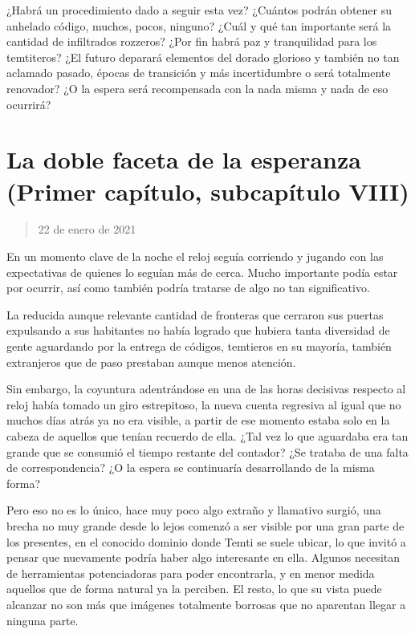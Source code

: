 \documentclass[
  spanish,
]{book}
\begin{document}
¿Habrá un procedimiento dado a seguir esta vez? ¿Cuántos podrán obtener su anhelado código, muchos, pocos, ninguno? ¿Cuál y qué tan importante será la cantidad de infiltrados rozzeros? ¿Por fin habrá paz y tranquilidad para los temtiteros? ¿El futuro deparará elementos del dorado glorioso y también no tan aclamado pasado, épocas de transición y más incertidumbre o será totalmente renovador? ¿O la espera será recompensada con la nada misma y nada de eso ocurrirá?

\hypertarget{la-doble-faceta-de-la-esperanza-primer-capuxedtulo-subcapuxedtulo-viii}{%
\section{La doble faceta de la esperanza (Primer capítulo, subcapítulo VIII)}\label{la-doble-faceta-de-la-esperanza-primer-capuxedtulo-subcapuxedtulo-viii}}

\begin{quote}
22 de enero de 2021
\end{quote}

En un momento clave de la noche el reloj seguía corriendo y jugando con las expectativas de quienes lo seguían más de cerca. Mucho importante podía estar por ocurrir, así como también podría tratarse de algo no tan significativo.

La reducida aunque relevante cantidad de fronteras que cerraron sus puertas expulsando a sus habitantes no había logrado que hubiera tanta diversidad de gente aguardando por la entrega de códigos, temtieros en su mayoría, también extranjeros que de paso prestaban aunque menos atención.

Sin embargo, la coyuntura adentrándose en una de las horas decisivas respecto al reloj había tomado un giro estrepitoso, la nueva cuenta regresiva al igual que no muchos días atrás ya no era visible, a partir de ese momento estaba solo en la cabeza de aquellos que tenían recuerdo de ella. ¿Tal vez lo que aguardaba era tan grande que se consumió el tiempo restante del contador? ¿Se trataba de una falta de correspondencia? ¿O la espera se continuaría desarrollando de la misma forma?

Pero eso no es lo único, hace muy poco algo extraño y llamativo surgió, una brecha no muy grande desde lo lejos comenzó a ser visible por una gran parte de los presentes, en el conocido dominio donde Temti se suele ubicar, lo que invitó a pensar que nuevamente podría haber algo interesante en ella. Algunos necesitan de herramientas potenciadoras para poder encontrarla, y en menor medida aquellos que de forma natural ya la perciben. El resto, lo que su vista puede alcanzar no son más que imágenes totalmente borrosas que no aparentan llegar a ninguna parte.
\end{document}
